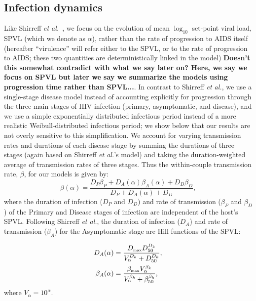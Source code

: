 \documentclass[10pt,letterpaper]{article}
\newcommand{\etal}{\textit{et al.}}
\newcommand{\tsub}[2]{#1_{{\textrm{\tiny #2}}}}
\newcommand{\todo}[1]{\textbf{#1}}
\begin{document}
\subsection*{Infection dynamics}

Like Shirreff \etal\ \cite{shirreff_transmission_2011}, we focus on the evolution of mean $\log_{10}$ set-point viral load, SPVL (which we denote as $\alpha$), rather than the rate of progression to AIDS itself
(hereafter ``virulence'' will refer either to the SPVL, or to 
the rate of progression to AIDS; these two quantities are
deterministically linked in the model) \todo{Doesn't this somewhat contradict with what we say later on? Here, we say we focus on SPVL but later we say we summarize the models using progression time rather than SPVL...}.
In contrast to Shirreff \etal, we use a single-stage disease model instead of accounting explicitly for progression through the three main stages of HIV infection (primary, asymptomatic, and disease), and we use a simple exponentially distributed infectious period instead of a more realistic Weibull-distributed infectious period; we show below that our results are not overly
sensitive to this simplification. We account for varying transmission rates and durations of each disease stage by summing the durations of three stages (again based on Shirreff \etal's model) and taking the duration-weighted average of transmission rates of three stages. Thus the within-couple transmission rate, $\beta$, for our models is given by:
\begin{equation}
\beta (\alpha) = \frac{D_P \beta_P + D_A (\alpha) \beta_A (\alpha) + D_D \beta_D}{D_P + D_A (\alpha) + D_D},
\end{equation}
where the duration of infection ($D_P$ and $D_D$) and rate of transmission ($\beta_P$ and $\beta_D$) of the Primary and Disease stages
of infection are independent of the host's SPVL. Following Shirreff \etal, the duration of infection ($D_A$) and rate of transmission ($\beta_A$) for the Asymptomatic stage are Hill functions of the SPVL:

\begin{equation}
\begin{split}
D_A(\alpha) &= \frac{\tsub{D}{max} D_{50} ^{D_k}}{V_\alpha ^{D_k} + D_{50}^{D_k}}, \\
\beta_A(\alpha) &= \frac{\tsub{\beta}{max} V_\alpha ^ {\beta_k}}%
{V_\alpha^{\beta_k} + \beta_{50} ^{\beta_k}},
\end{split}
\label{eq:hillfuns}
\end{equation}
where $V_{\alpha} = 10^\alpha$. 
\end{document}
